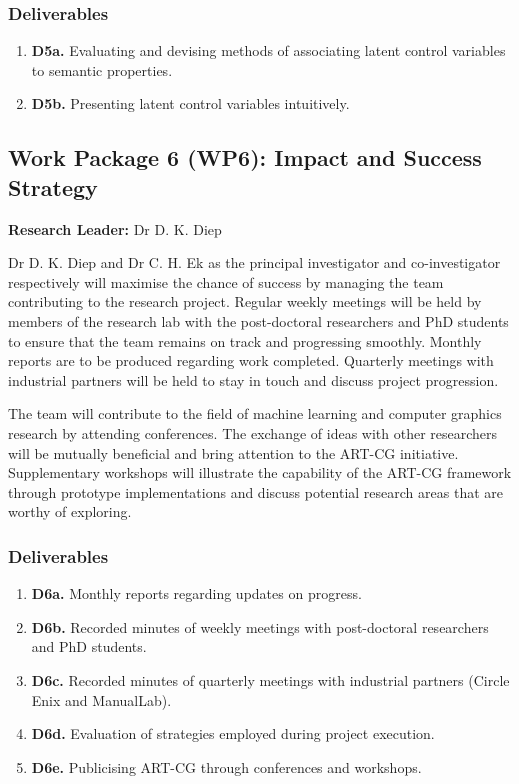 \documentclass[a4paper, 11pt, onecolumn]{article} %
\numberwithin{equation}{section} %
\numberwithin{figure}{section} %
\numberwithin{table}{section} %
\begin{document}
\subsubsection*{Deliverables} 
\begin{enumerate}
	\item \textbf{D5a.} Evaluating and devising methods of associating latent control variables to semantic properties.
	\item \textbf{D5b.} Presenting latent control variables intuitively.
\end{enumerate}

\subsection*{Work Package 6 (WP6): Impact and Success Strategy}
\textbf{Research Leader:} Dr D. K. Diep\par

Dr D. K. Diep and Dr C. H. Ek as the principal investigator and co-investigator respectively will maximise the chance of success by managing the team contributing to the research project. Regular weekly meetings will be held by members of the research lab with the post-doctoral researchers and PhD students to ensure that the team remains on track and progressing smoothly. Monthly reports are to be produced regarding work completed. Quarterly meetings with industrial partners will be held to stay in touch and discuss project progression.

The team will contribute to the field of machine learning and computer graphics research by attending conferences. The exchange of ideas with other researchers will be mutually beneficial and bring attention to the ART-CG initiative. Supplementary workshops will illustrate the capability of the ART-CG framework through prototype implementations and discuss potential research areas that are worthy of exploring.

\subsubsection*{Deliverables} 
\begin{enumerate}
	\item \textbf{D6a.} Monthly reports regarding updates on progress.
	\item \textbf{D6b.} Recorded minutes of weekly meetings with post-doctoral researchers and PhD students.
	\item \textbf{D6c.} Recorded minutes of quarterly meetings with industrial partners (Circle Enix and ManualLab).
	\item \textbf{D6d.} Evaluation of strategies employed during project execution.
	\item \textbf{D6e.} Publicising ART-CG through conferences and workshops.
\end{enumerate}
\end{document}
